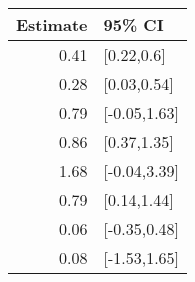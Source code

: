 \begin{tabular}{rl}
  \hline
Estimate & 95\% CI \\ 
  \hline
0.41 & [0.22,0.6] \\ 
  0.28 & [0.03,0.54] \\ 
  0.79 & [-0.05,1.63] \\ 
  0.86 & [0.37,1.35] \\ 
  1.68 & [-0.04,3.39] \\ 
  0.79 & [0.14,1.44] \\ 
  0.06 & [-0.35,0.48] \\ 
  0.08 & [-1.53,1.65] \\ 
   \hline
\end{tabular}

